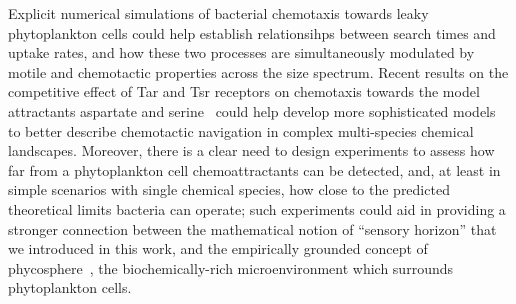 \documentclass[9pt,twocolumn,twoside]{pnas-new}
\begin{document}
Explicit numerical simulations of bacterial chemotaxis towards leaky phytoplankton cells could help establish relationsihps between search times and uptake rates, and how these two processes are simultaneously modulated by motile and chemotactic properties across the size spectrum.
Recent results on the competitive effect of Tar and Tsr receptors on chemotaxis towards the model attractants aspartate and serine~\cite{li2024phenotypic} could help develop more sophisticated models to better describe chemotactic navigation in complex multi-species chemical landscapes.
Moreover, there is a clear need to design experiments to assess how far from a phytoplankton cell chemoattractants can be detected, and, at least in simple scenarios with single chemical species, how close to the predicted theoretical limits bacteria can operate; such experiments could aid in providing a stronger connection between the mathematical notion of ``sensory horizon'' that we introduced in this work, and the empirically grounded concept of phycosphere~\cite{seymour2017zooming,bell1972chemotactic,platt2023probing}, the biochemically-rich microenvironment which surrounds phytoplankton cells.


%
%
\end{document}
